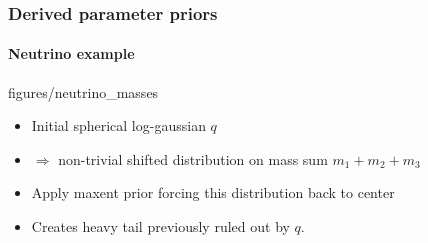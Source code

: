 \documentclass[%
]{beamer}
\begin{document}
\begin{frame}
    \frametitle{Derived parameter priors}
    \framesubtitle{Neutrino example}
	\begin{figright}{figures/neutrino_masses}
        \begin{itemize}
            \item Initial spherical log-gaussian $q$
            \item $\Rightarrow$ non-trivial shifted distribution on mass sum $m_1+m_2+m_3$
            \item Apply maxent prior forcing this distribution back to center
            \item Creates heavy tail previously ruled out by $q$.
        \end{itemize}
	\end{figright}
\end{frame}


%
% 



\end{document}
